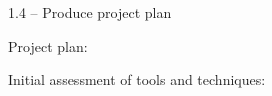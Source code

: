 \documentclass{article}
\begin{document}
1.4 – Produce project plan

Project plan:

Initial assessment of tools and techniques:



\end{document}
